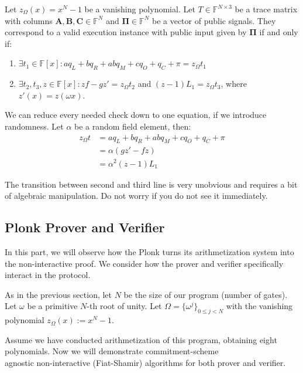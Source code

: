 \documentclass[../../book.tex]{subfiles}
\begin{document}
\begin{definition}
Let $z_{\Omega}(x) = x^N - 1$ be a vanishing polynomial. Let $T \in \mathbb{F}^{N
\times 3}$ be a trace matrix with columns $\mathbf{A}, \mathbf{B}, \mathbf{C}
\in \mathbb{F}^N$ and $\boldsymbol{\Pi} \in \mathbb{F}^N$ be a vector of public
signals. They correspond to a valid execution instance with public input given
by $\boldsymbol{\Pi}$ if and only if:

\begin{enumerate}
    \item \(\exists t_1 \in \mathbb{F}[x]: aq_L + bq_R + abq_M + cq_O + q_C + \pi = z_{\Omega}t_1\)
    \item \(\exists t_2, t_3, z \in \mathbb{F}[x]: zf - gz' = z_{\Omega}t_2\) and \((z-1)L_1 = z_{\Omega}t_3\), where $z'(x) = z(\omega x)$.
\end{enumerate}
\end{definition}
\begin{remark}
We can reduce every needed check down to one equation, if we introduce randomness.
Let $\alpha$ be a random field element, then: 
\[
    \begin{aligned}
        z_{\Omega}t &= aq_L + bq_R + abq_M + cq_O + q_C + \pi \\
        &= \alpha(gz' - fz) \\
        &= \alpha^2(z - 1)L_1
    \end{aligned}
\]

The transition between second and third line is very unobvious and requires a 
bit of algebraic manipulation. Do not worry if you do not see it immediately.
\end{remark}


\subsection{Plonk Prover and Verifier}

In this part, we will observe how the Plonk turns its arithmetization system
into the non-interactive proof. We consider how the prover and verifier specifically interact
in the protocol.

As in the previous section, let $N$ be the size of our program (number of
gates). Let $\omega$ be a primitive $N$-th root of unity. Let $\Omega =
\{\omega^j\}_{0 \leq j < N}$ with the vanishing polynomial $z_{\Omega}(x) := x^N
- 1$.

Assume we have conducted arithmetization of this program, obtaining eight
polynomials. Now we will demonstrate commitment-scheme \\
agnostic non-interactive (Fiat-Shamir) algorithms for both prover and verifier.
\end{document}
